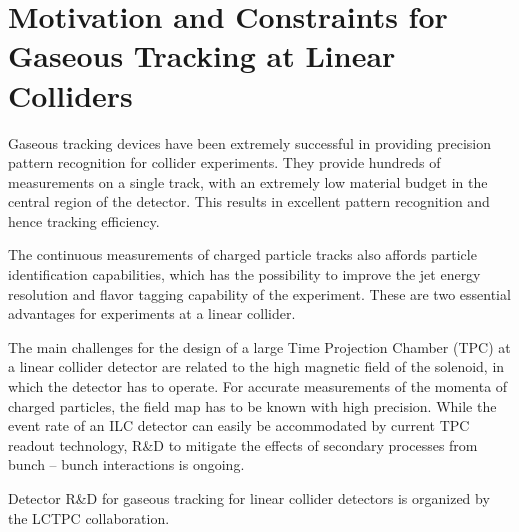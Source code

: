 \section{Motivation and Constraints for Gaseous Tracking at Linear Colliders}

Gaseous tracking devices have been extremely successful in providing precision pattern recognition for collider experiments. They provide hundreds of measurements on a single track, with an extremely low material budget in the central region of the detector. This results in excellent pattern recognition and hence tracking efficiency.

The continuous measurements of charged particle tracks also affords particle identification capabilities, which has the possibility to improve the jet energy resolution and flavor tagging capability of the experiment. These are two essential advantages for experiments at a linear collider.

The main challenges for the design of a large Time Projection Chamber (TPC) at a linear collider detector are related to the high magnetic field of the solenoid, in which the detector has to operate. For accurate measurements of the momenta of charged particles, the field map has to be known with high precision. While the event rate of an ILC detector can easily be accommodated by current TPC readout technology, R\&D to mitigate the effects of secondary processes from bunch -- bunch interactions is ongoing.

Detector R\&D for gaseous tracking for linear collider detectors is organized by the LCTPC collaboration.